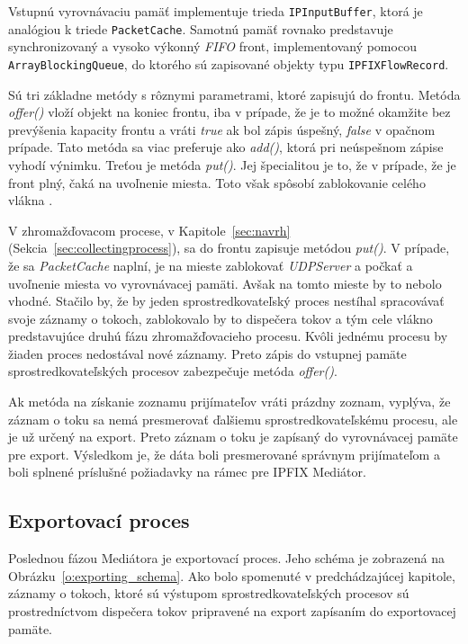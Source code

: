 Vstupnú vyrovnávaciu pamäť implementuje trieda \verb|IPInputBuffer|, ktorá je analógiou k triede \verb|PacketCache|.
Samotnú pamäť rovnako predstavuje synchronizovaný a vysoko výkonný \emph{FIFO} front, implementovaný 
pomocou \verb|ArrayBlockingQueue|, do ktorého sú zapisované objekty typu \verb|IPFIXFlowRecord|.

Sú tri základne metódy s rôznymi parametrami, ktoré zapisujú do frontu.
Metóda \emph{offer()} vloží objekt na koniec frontu, iba v prípade, že je to možné 
okamžite bez prevýšenia kapacity frontu a vráti \emph{true} ak bol zápis úspešný, \emph{false} v 
opačnom prípade. Tato metóda sa viac preferuje ako \emph{add()}, ktorá pri neúspešnom zápise 
vyhodí výnimku. Treťou je metóda \emph{put()}. Jej špecialitou je to, že v prípade, že je front plný,
čaká na uvoľnenie miesta. Toto však spôsobí zablokovanie celého vlákna \citep{arrayblockingqueue}.

V zhromažďovacom procese, v Kapitole~\ref{sec:navrh} (Sekcia~\ref{sec:collectingprocess}),
sa do frontu zapisuje metódou \emph{put()}. V prípade, že sa \emph{PacketCache} naplní, je na mieste 
zablokovať \emph{UDPServer} a počkať a uvoľnenie miesta vo vyrovnávacej pamäti. Avšak na tomto mieste by 
to nebolo vhodné. Stačilo by, že by jeden sprostredkovateľský proces nestíhal spracovávať svoje záznamy
o tokoch, zablokovalo by to dispečera tokov a tým cele vlákno predstavujúce druhú fázu zhromažďovacieho
procesu. Kvôli jednému procesu by žiaden proces nedostával nové záznamy. Preto zápis do vstupnej pamäte
sprostredkovateľských procesov zabezpečuje metóda \emph{offer()}.

Ak metóda na získanie zoznamu prijímateľov vráti prázdny zoznam, vyplýva, že záznam o toku 
sa nemá presmerovať ďalšiemu sprostredkovateľskému procesu, ale je už určený na export. Preto záznam o 
toku je zapísaný do vyrovnávacej pamäte pre export. Výsledkom je, že dáta boli presmerované správnym 
prijímateľom a boli splnené príslušné požiadavky na rámec pre IPFIX Mediátor.

\subsection{Exportovací proces}

Poslednou fázou Mediátora je exportovací proces. Jeho schéma je zobrazená na 
Obrázku~\ref{o:exporting_schema}. Ako bolo spomenuté v predchádzajúcej kapitole, záznamy 
o tokoch, ktoré sú výstupom  sprostredkovateľských procesov sú prostredníctvom dispečera 
tokov pripravené na export zapísaním do exportovacej pamäte.

